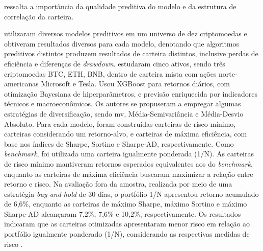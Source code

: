 ressalta a importância da qualidade preditiva do modelo e da estrutura de correlação da carteira. 

 utilizaram diversos modelos preditivos em um universo de dez criptomoedas e obtiveram resultados diversos para cada modelo, denotando que algoritmos preditivos distintos produzem resultados de carteira distintos, inclusive perdas de eficiência e diferenças de \textit{drawdown}.  estudaram cinco ativos, sendo três criptomoedas BTC, ETH, BNB, dentro de carteira mista com ações norte-americanas Microsoft e Tesla. Usou XGBoost para retornos diários, com otimização Bayesiana de hiperparâmetros, e previsão enriquecida por indicadores técnicos e macroeconômicos. Os autores se propuseram a empregar algumas estratégias de diversificação, sendo \acl{mv}, Média-Semivariância e Média-Desvio Absoluto. Para cada modelo, foram construídas carteiras de risco mínimo, carteiras considerando um retorno-alvo, e carteiras de máxima eficiência, com base nos índices de Sharpe, Sortino e Sharpe-AD, respectivamente. Como \textit{benchmark}, foi utilizada uma carteira igualmente ponderada (1/N). As carteiras de risco mínimo mantiveram retornos esperados equivalentes aos do \textit{benchmark}, enquanto as carteiras de máxima eficiência buscaram maximizar a relação entre retorno e risco. Na avaliação fora da amostra, realizada por meio de uma estratégia \textit{buy-and-hold} de 30 dias, o portfólio 1/N apresentou retorno acumulado de 6,6\%, enquanto as carteiras de máximo Sharpe, máximo Sortino e máximo Sharpe-AD alcançaram 7,2\%, 7,6\% e 10,2\%, respectivamente. Os resultados indicaram que as carteiras otimizadas apresentaram menor risco em relação ao portfólio igualmente ponderado (1/N), considerando as respectivas medidas de risco \cite{peykani2026machine}.

